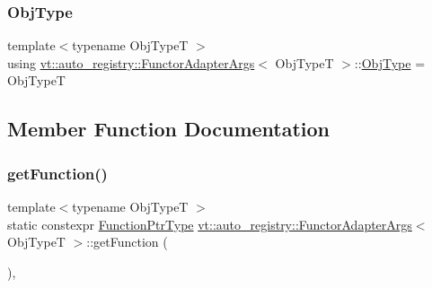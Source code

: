 \mbox{\label{structvt_1_1auto__registry_1_1_functor_adapter_args_3_01_obj_type_t_01_4_abb65398167f825b9b8f8a0e440eaf886}} 
\subsubsection{\texorpdfstring{Obj\+Type}{ObjType}}
{\footnotesize\ttfamily template$<$typename Obj\+TypeT $>$ \\
using \hyperlink{structvt_1_1auto__registry_1_1_functor_adapter_args}{vt\+::auto\+\_\+registry\+::\+Functor\+Adapter\+Args}$<$ Obj\+TypeT $>$\+::\hyperlink{structvt_1_1auto__registry_1_1_functor_adapter_args_3_01_obj_type_t_01_4_abb65398167f825b9b8f8a0e440eaf886}{Obj\+Type} =  Obj\+TypeT}



\subsection{Member Function Documentation}
\mbox{\label{structvt_1_1auto__registry_1_1_functor_adapter_args_3_01_obj_type_t_01_4_ac8ddcc5c26304b7bbba3f9b13b0f72d4}} 
\subsubsection{\texorpdfstring{get\+Function()}{getFunction()}}
{\footnotesize\ttfamily template$<$typename Obj\+TypeT $>$ \\
static constexpr \hyperlink{structvt_1_1auto__registry_1_1_functor_adapter_args_3_01_obj_type_t_01_4_a7f916fba5fb1c01c4aa7cd266bff6851}{Function\+Ptr\+Type} \hyperlink{structvt_1_1auto__registry_1_1_functor_adapter_args}{vt\+::auto\+\_\+registry\+::\+Functor\+Adapter\+Args}$<$ Obj\+TypeT $>$\+::get\+Function (\begin{DoxyParamCaption}{ }\end{DoxyParamCaption})\hspace{0.3cm}{\ttfamily [inline]}, {\ttfamily [static]}}

